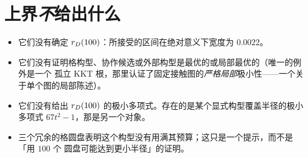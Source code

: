 \section{上界\emph{不}给出什么}

\begin{itemize}[leftmargin=1.4em,itemsep=2pt]
\item 它们没有确定 $r_{D}(100)$：所接受的区间在绝对意义下宽度为 $0.0022$。
\item 它们没有证明格构型、协作候选或外部构型是最优的或局部最优的（唯一的例外是一个
孤立 KKT 根，那里认证了固定接触图的\emph{严格局部}极小性——一个关于单个图的局部陈述）。
\item 它们没有给出 $r_{D}(100)$ 的极小多项式。存在的是某个显式构型覆盖半径的极小多项式
$67t^2-1$，那是另一个对象。
\item 三个冗余的格圆盘表明这个构型没有用满其预算；这只是一个提示，而不是「用 $100$ 个
圆盘可能达到更小半径」的证明。
\end{itemize}
